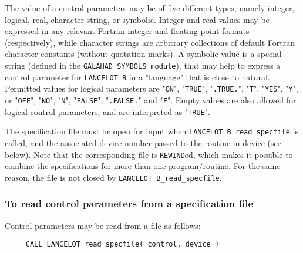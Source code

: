 \documentclass{galahad}
\newcommand{\packagename}{LANCELOT B}
\begin{document}
The value of a control parameters may be of five different types, namely
integer, logical, real, character string, or symbolic.
Integer and real values may be expressed in any relevant Fortran integer and
floating-point formats (respectively), while
character strings are arbitrary collections of default Fortran character
constants (without quotation marks).
A symbolic value is a special string (defined in the
{\tt GALAHAD\_SYMBOLS module}),
that may help to express a control parameter for {\tt \packagename}
in a "language" that is close to natural.  Permitted values for logical
parameters are "{\tt ON}", "{\tt TRUE}", "{\tt .TRUE.}", "{\tt T}",
"{\tt YES}", "{\tt Y}", or "{\tt OFF}", "{\tt NO}",
"{\tt N}", "{\tt FALSE}", "{\tt .FALSE.}" and "{\tt F}".
Empty values are also allowed for
logical control parameters, and are interpreted as "{\tt TRUE}".

The specification file must be open for
input when {\tt \packagename\_read\_specfile}
is called, and the associated device number
passed to the routine in device (see below).
Note that the corresponding
file is {\tt REWIND}ed, which makes it possible to combine the specifications
for more than one program/routine.  For the same reason, the file is not
closed by {\tt \packagename\_read\_specfile}.

\subsubsection{To read control parameters from a specification file}
\label{readspec}

Control parameters may be read from a file as follows:
\hskip0.5in
\def\baselinestretch{0.8} {\tt \begin{verbatim}
     CALL LANCELOT_read_specfile( control, device )
\end{verbatim}}
\def\baselinestretch{1.0}
\end{document}
